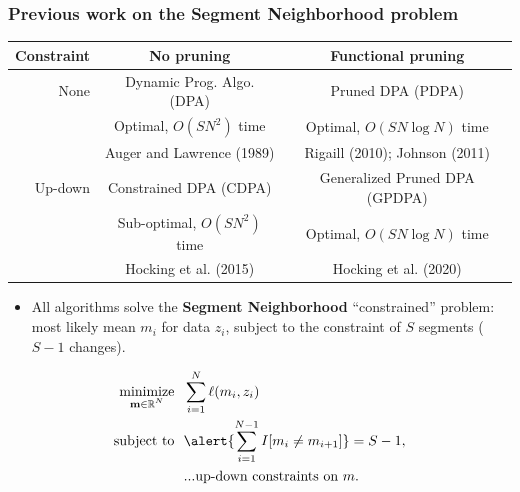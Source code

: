 \documentclass[t]{beamer}
\DeclareMathOperator*{\minimize}{minimize}
\newcommand{\RR}{\mathbb R}
\begin{document}
\begin{frame}
  \frametitle{Previous work on the Segment Neighborhood problem}
{  \scriptsize
    \begin{tabular}{r|c|c}
    Constraint & No pruning & Functional pruning \\
    \hline
    None & Dynamic Prog. Algo. (DPA) & Pruned DPA (PDPA) \\
    & Optimal, $O(SN^2)$ time & Optimal, $O(SN\log N)$ time\\
    & Auger and Lawrence (1989) & Rigaill (2010); Johnson (2011) \\
    \hline
    Up-down & Constrained DPA (CDPA) & Generalized Pruned DPA (GPDPA) \\
    & Sub-optimal, $O(SN^2)$ time & Optimal, $O(SN\log N)$ time\\
    & Hocking et al. (2015) & Hocking et al. (2020) \\
    \hline
  \end{tabular}
}
  \begin{itemize}
  \item All algorithms solve the \textbf{Segment Neighborhood}
    ``constrained'' problem: most likely mean $m_i$ for data $z_i$,
    subject to the constraint of $S$ segments ($S-1$ \alert{changes}).
  \end{itemize} 
\begin{align*}
    \minimize_{\substack{
  \mathbf m\in\RR^{N}
  }} &\ \ 
    \sum_{i=1}^N \ell( m_i,  z_i) 
\\
      \text{subject to} &\ \ {\alert{\sum_{i=1}^{N-1} I[m_i\neq m_{i+1}]}=S-1,}
  \nonumber\\
  &\ \ \text{...up-down constraints on $m$.}
  \nonumber 
\end{align*}
\end{frame}
\end{document}
